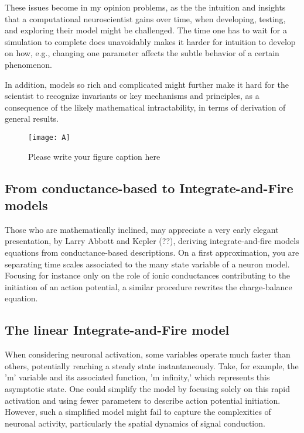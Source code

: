 These issues become in my opinion problems, as the the intuition and insights that a computational neuroscientist gains over time, when developing, testing, and exploring their model might be challenged. The time one has to wait for a simulation to complete does unavoidably makes it harder for intuition to develop on how, e.g., changing one parameter affects the subtle behavior of a certain phenomenon. 

In addition, models so rich and complicated might further make it hard for the scientist to recognize invariants or key mechanisms and principles, as a consequence of the likely mathematical intractability, in terms of derivation of general results.

\begin{figure}[t]
\sidecaption[t]
\centering
\texttt{[image: A]}
\caption{Please write your figure caption here}
\label{fig:A1}       %
\end{figure}



\subsection{From conductance-based to Integrate-and-Fire models}

Those who are mathematically inclined, may appreciate a very early elegant presentation, by Larry Abbott and Kepler (??), deriving integrate-and-fire models equations from conductance-based descriptions. On a first approximation, you are separating time scales associated to the many state variable of a neuron model. Focusing for instance only on the role of ionic conductances contributing to the initiation of an action potential, a similar procedure rewrites the charge-balance equation.

\subsection{The linear Integrate-and-Fire model}

When considering neuronal activation, some variables operate much faster than others, potentially reaching a steady state instantaneously. Take, for example, the 'm' variable and its associated function, 'm infinity,' which represents this asymptotic state. One could simplify the model by focusing solely on this rapid activation and using fewer parameters to describe action potential initiation. However, such a simplified model might fail to capture the complexities of neuronal activity, particularly the spatial dynamics of signal conduction.

